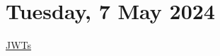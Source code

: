 \section[2024/05/07]{Tuesday, 7 May 2024}

\href{https://www.mwrcybersec.com/research\_items/juggling-with-tokens-securing-jwts}{JWTs}

